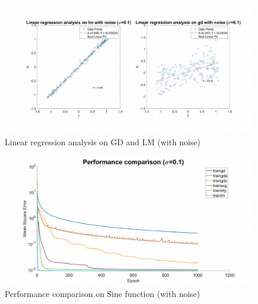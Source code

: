 \documentclass{article}
\begin{document}
\begin{figure}[h!]
  \centering
  \includegraphics[width=\textwidth]{lab1/lmgdcomparewithnoise.pdf}
  \caption{Linear regression analysis on GD and LM (with noise)}
  \label{fig:noiselmgd}
\end{figure}

\begin{figure}[h!]
  \centering
  \includegraphics[width=\textwidth]{lab1/performancewithnoise.pdf}
  \caption{Performance comparison on Sine function (with noise)}
  \label{fig:noiseperform}
\end{figure}


\end{document}
